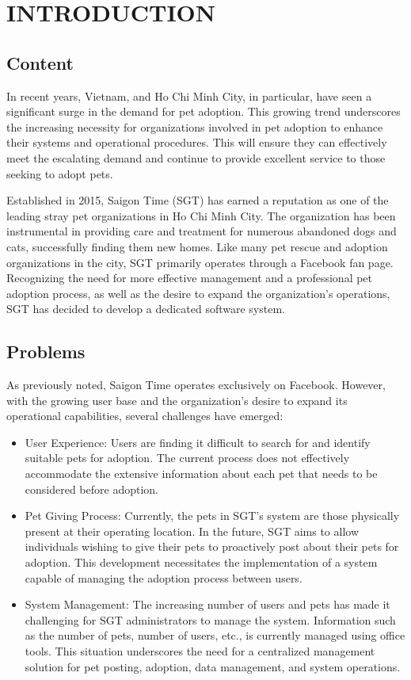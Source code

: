 
\chapter{INTRODUCTION}
\section{Content}
In recent years, Vietnam, and Ho Chi Minh City, in particular, have seen a significant surge in the demand for pet adoption. This growing trend underscores the increasing necessity for organizations involved in pet adoption to enhance their systems and operational procedures. This will ensure they can effectively meet the escalating demand and continue to provide excellent service to those seeking to adopt pets.

Established in 2015, Saigon Time (SGT) has earned a reputation as one of the leading stray pet organizations in Ho Chi Minh City. The organization has been instrumental in providing care and treatment for numerous abandoned dogs and cats, successfully finding them new homes. Like many pet rescue and adoption organizations in the city, SGT primarily operates through a Facebook fan page. Recognizing the need for more effective management and a professional pet adoption process, as well as the desire to expand the organization’s operations, SGT has decided to develop a dedicated software system.

\section{Problems}

As previously noted, Saigon Time operates exclusively on Facebook. However, with the growing user base and the organization’s desire to expand its operational capabilities, several challenges have emerged:
\begin{itemize}
    \item User Experience: Users are finding it difficult to search for and identify suitable pets for adoption. The current process does not effectively accommodate the extensive information about each pet that needs to be considered before adoption.
    \item Pet Giving Process: Currently, the pets in SGT’s system are those physically present at their operating location. In the future, SGT aims to allow individuals wishing to give their pets to proactively post about their pets for adoption. This development necessitates the implementation of a system capable of managing the adoption process between users.
    \item System Management: The increasing number of users and pets has made it challenging for SGT administrators to manage the system. Information such as the number of pets, number of users, etc., is currently managed using office tools. This situation underscores the need for a centralized management solution for pet posting, adoption, data management, and system operations.
\end{itemize}

